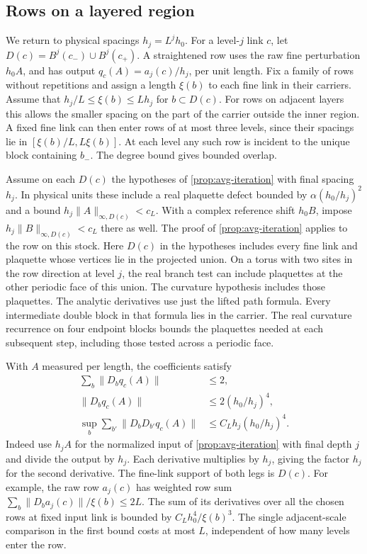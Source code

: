 \documentclass[11pt,letterpaper,reqno]{amsart}
\numberwithin{equation}{section}
\theoremstyle{definition}
\theoremstyle{remark}
\begin{document}
\subsection{Rows on a layered region}

We return to physical spacings \(h_j=L^j h_0\). For a level-\(j\)
link \(c\), let \(D(c)=B^j(c_-)\cup B^j(c_+)\). A straightened
row uses the raw fine perturbation \(h_0A\), and has output
\(q_c(A)=a_j(c)/h_j\), per unit length. Fix a family of rows
without repetitions and assign a length \(\xi(b)\) to each fine
link in their carriers. Assume that \(h_j/L\leq\xi(b)\leq Lh_j\)
for \(b\subset D(c)\). For rows on adjacent layers this allows the
smaller spacing on the part of the carrier outside the inner
region. A fixed fine link can then enter rows of at most three
levels, since their spacings lie in \([\xi(b)/L,L\xi(b)]\).
At each level any such row is incident to the unique block
containing \(b_-\). The degree bound gives bounded overlap.

Assume on each \(D(c)\) the hypotheses of
\cref{prop:avg-iteration} with final spacing \(h_j\). In physical
units these include a real plaquette defect bounded by
\(\alpha(h_0/h_j)^2\) and a bound \(h_j\|A\|_{\infty,D(c)}<c_L\).
With a complex reference shift \(h_0B\), impose
\(h_j\|B\|_{\infty,D(c)}<c_L\) there as well.
The proof of \cref{prop:avg-iteration} applies to the row on
this stock. Here \(D(c)\) in the hypotheses includes every fine
link and plaquette whose vertices lie in the projected union.
On a torus with two sites in the row direction at level \(j\),
the real branch test can include plaquettes at the other periodic
face of this union. The curvature hypothesis includes those
plaquettes. The analytic derivatives use just the lifted path
formula. Every intermediate double block in that formula lies in
the carrier. The real curvature recurrence on four endpoint
blocks bounds the plaquettes needed at each subsequent step,
including those tested across a periodic face.

With \(A\) measured per length, the coefficients satisfy
\begin{equation}
 \begin{split}
 \sum_b\|D_bq_c(A)\|&\leq 2,\\
 \|D_bq_c(A)\|&\leq 2(h_0/h_j)^4,\\
 \sup_b\sum_{b'}\|D_bD_{b'}q_c(A)\|
             &\leq C_L h_j(h_0/h_j)^4 .
 \end{split}
 \label{eq:avg-layered-coeffs}
\end{equation}
Indeed use \(h_j A\) for the normalized input of
\cref{prop:avg-iteration} with final depth \(j\) and divide
the output by \(h_j\). Each derivative multiplies by
\(h_j\), giving the factor \(h_j\) for the second derivative.
The fine-link support of both legs is \(D(c)\).
For example, the raw row \(a_j(c)\) has weighted row sum
\(\sum_b\|D_ba_j(c)\|/\xi(b)\leq 2L\).
The sum of its derivatives over all the chosen rows at fixed
input link is bounded by \(C_L h_0^4/\xi(b)^3\).
The single adjacent-scale comparison in the first bound costs
at most \(L\), independent of how many levels enter the row.
\end{document}
